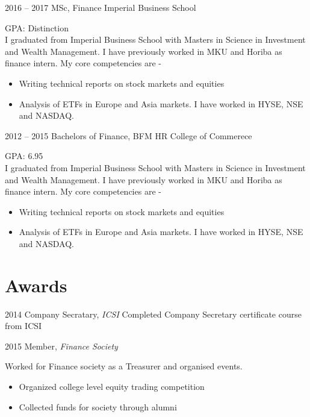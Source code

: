 \documentclass[10pt]{friggeri-cv}
\begin{document}
\begin{entrylist}

  \entry
    {2016 -- 2017}
    {MSc, {\normalfont Finance }}
    {Imperial Business School}
    {GPA: Distinction\\ I graduated from Imperial Business School with Masters in Science in Investment and Wealth Management. I have previously worked in MKU and Horiba as finance intern. My core competencies are -   \begin{itemize}  	\item Writing technical reports on stock markets and equities  	\item Analysis of ETFs in Europe and Asia markets. I have worked in HYSE, NSE and NASDAQ.  \end{itemize} }


  \entry
    {2012 -- 2015}
    {Bachelors of Finance, {\normalfont BFM }}
    {HR College of Commerece}
    {GPA: 6.95\\ I graduated from Imperial Business School with Masters in Science in Investment and Wealth Management. I have previously worked in MKU and Horiba as finance intern. My core competencies are -   \begin{itemize}  	\item Writing technical reports on stock markets and equities  	\item Analysis of ETFs in Europe and Asia markets. I have worked in HYSE, NSE and NASDAQ.  \end{itemize} }


\end{entrylist}


\section{Awards}

\begin{entrylist}

  \entry
    {2014}
    {Company Secratary, \emph{ICSI}}
    {}
    { Completed Company Secretary certificate course from ICSI  }

  \entry
    {2015}
    {Member, \emph{Finance Society}}
    {}
    { Worked for Finance society as a Treasurer and organised events.   \begin{itemize}  	\item Organized college level equity trading competition  	\item Collected funds for society through alumni  \end{itemize} }

\end{entrylist}
\end{document}
